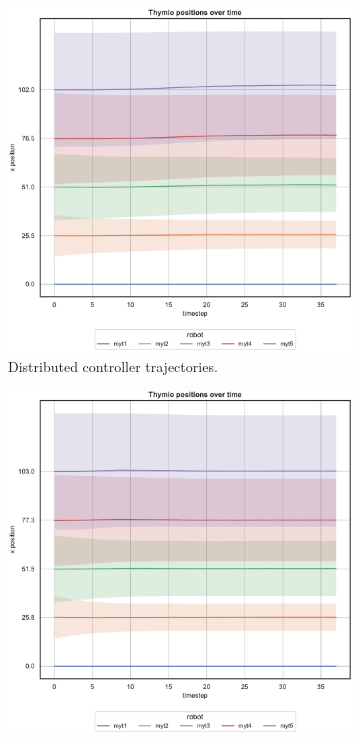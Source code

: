 \begin{figure}[!htb]
\begin{center}
\begin{subfigure}[h]{0.49\textwidth}
			\includegraphics[width=\textwidth]{contents/images/net-d12/position-overtime-learned_distributed}
			\caption{Distributed controller trajectories.}
		\end{subfigure}
	\end{center}
	\begin{center}
		\begin{subfigure}[h]{0.49\textwidth}
			\centering			
			\includegraphics[width=.95\textwidth]{contents/images/net-d12/position-overtime-manual}%

\end{subfigure}
\end{center}
\end{figure}
